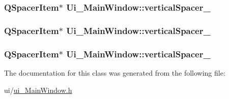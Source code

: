 \label{classUi__MainWindow_a8384329c3663ff274e926a12024aab52}
\hypertarget{classUi__MainWindow_adc1f5fdd97fb3729999c56902d0fa591}{
\subsubsection[{verticalSpacer\_\-2}]{\setlength{\rightskip}{0pt plus 5cm}QSpacerItem$\ast$ {\bf Ui\_\-MainWindow::verticalSpacer\_}}}
\label{classUi__MainWindow_adc1f5fdd97fb3729999c56902d0fa591}
\hypertarget{classUi__MainWindow_ac845bdf6b5b5237378a7b067808b7a31}{
\subsubsection[{verticalSpacer\_\-3}]{\setlength{\rightskip}{0pt plus 5cm}QSpacerItem$\ast$ {\bf Ui\_\-MainWindow::verticalSpacer\_}}}
\label{classUi__MainWindow_ac845bdf6b5b5237378a7b067808b7a31}
\hypertarget{classUi__MainWindow_a298e82ba0cc2500cd61f393f493e4529}{
\subsubsection[{verticalSpacer\_\-4}]{\setlength{\rightskip}{0pt plus 5cm}QSpacerItem$\ast$ {\bf Ui\_\-MainWindow::verticalSpacer\_}}}
\label{classUi__MainWindow_a298e82ba0cc2500cd61f393f493e4529}


The documentation for this class was generated from the following file:\begin{DoxyCompactItemize}
\item 
ui/\hyperlink{ui__MainWindow_8h}{ui\_\-MainWindow.h}\end{DoxyCompactItemize}
